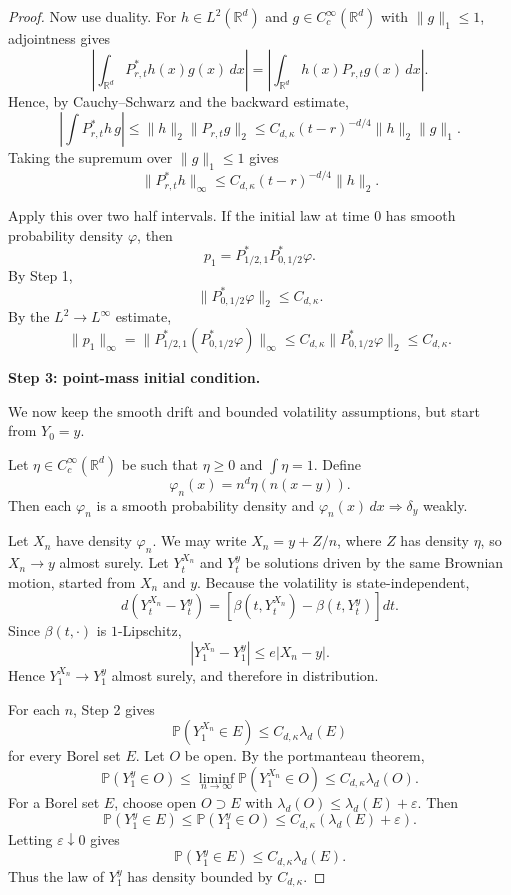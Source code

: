 \documentclass{article}
\newcommand{\1}{\mathbbm{1}}
\numberwithin{equation}{section}
\def\to{\rightarrow}
\begin{document}
\begin{proof}
Now use duality. For \(h\in L^2(\mathbb R^d)\) and
\(g\in C_c^\infty(\mathbb R^d)\) with \(\|g\|_1\le 1\), adjointness gives
\[
\left|
\int_{\mathbb R^d} P_{r,t}^\ast h(x)g(x)\,dx
\right|
=
\left|
\int_{\mathbb R^d} h(x)P_{r,t}g(x)\,dx
\right|.
\]
Hence, by Cauchy--Schwarz and the backward estimate,
$$
\left|
\int P_{r,t}^\ast h\,g
\right|
\le
\|h\|_2\|P_{r,t}g\|_2
\le
C_{d,\kappa}(t-r)^{-d/4}\|h\|_2\|g\|_1 .
$$
Taking the supremum over $\|g\|_1\le1$ gives
$$
\|P_{r,t}^\ast h\|_\infty
\le
C_{d,\kappa}(t-r)^{-d/4}\|h\|_2 .
$$

Apply this over two half intervals. If the initial law at time $0$ has smooth
probability density $\varphi$, then
$$
p_1=P_{1/2,1}^\ast P_{0,1/2}^\ast\varphi .
$$
By Step 1,
$$
\|P_{0,1/2}^\ast\varphi\|_2\le C_{d,\kappa}.
$$
By the $L^2\to L^\infty$ estimate,
$$
\|p_1\|_\infty
=
\|P_{1/2,1}^\ast(P_{0,1/2}^\ast\varphi)\|_\infty
\le
C_{d,\kappa}\|P_{0,1/2}^\ast\varphi\|_2
\le
C_{d,\kappa}.
$$

\medskip

\textbf{Step 3: point-mass initial condition.}

We now keep the smooth drift and bounded volatility assumptions, but start
from $Y_0=y$.

Let $\eta\in C_c^\infty(\mathbb R^d)$ be such that
$\eta\ge0$ and $\int \eta=1$. Define
$$
\varphi_n(x)=n^d\eta(n(x-y)).
$$
Then each $\varphi_n$ is a smooth probability density and
$\varphi_n(x)\,dx\Rightarrow \delta_y$ weakly.

Let $X_n$ have density $\varphi_n$. We may write $X_n=y+Z/n$, where $Z$ has
density $\eta$, so $X_n\to y$ almost surely. Let $Y_t^{X_n}$ and $Y_t^y$ be
solutions driven by the same Brownian motion, started from $X_n$ and $y$.
Because the volatility is state-independent,
$$
d(Y_t^{X_n}-Y_t^y)
=
\left[\beta(t,Y_t^{X_n})-\beta(t,Y_t^y)\right]dt .
$$
Since $\beta(t,\cdot)$ is $1$-Lipschitz,
$$
|Y_1^{X_n}-Y_1^y|\le e|X_n-y|.
$$
Hence $Y_1^{X_n}\to Y_1^y$ almost surely, and therefore in distribution.

For each $n$, Step 2 gives
$$
\mathbb P(Y_1^{X_n}\in E)\le C_{d,\kappa}\lambda_d(E)
$$
for every Borel set $E$. Let $O$ be open. By the portmanteau theorem,
$$
\mathbb P(Y_1^y\in O)
\le
\liminf_{n\to\infty}\mathbb P(Y_1^{X_n}\in O)
\le
C_{d,\kappa}\lambda_d(O).
$$
For a Borel set $E$, choose open $O\supset E$ with
$\lambda_d(O)\le \lambda_d(E)+\varepsilon$. Then
$$
\mathbb P(Y_1^y\in E)
\le
\mathbb P(Y_1^y\in O)
\le
C_{d,\kappa}(\lambda_d(E)+\varepsilon).
$$
Letting $\varepsilon\downarrow0$ gives
$$
\mathbb P(Y_1^y\in E)\le C_{d,\kappa}\lambda_d(E).
$$
Thus the law of $Y_1^y$ has density bounded by $C_{d,\kappa}$.


\end{proof}
\end{document}
